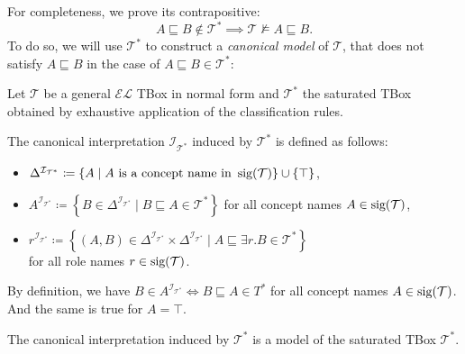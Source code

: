 For completeness, we prove its contrapositive:
\[
	A \sqsubseteq B \notin \mathcal{T}^* \implies \mathcal{T} \not\vDash A \sqsubseteq B
.\]
To do so, we will use $\mathcal{T}^*$ to construct a \textit{canonical model} of $\mathcal{T}$,
that does not satisfy $A \sqsubseteq B$ in the case of $A \sqsubseteq B \in \mathcal{T}^*$:
\begin{definition}
	Let $\mathcal{T}$ be a general $\mathcal{EL}$ TBox in normal form and $\mathcal{T}^*$ the saturated TBox
	obtained by exhaustive application of the classification rules.
	
	The canonical interpretation $\mathcal{I}_{\mathcal{T}^*}$ induced by $\mathcal{T}^*$ is defined as follows:
	\begin{itemize}
		\item $\Delta^{\mathcal{I}_{\mathcal{T}^*}} \coloneqq \left\{ A \mid A \text{ is a concept name in } \operatorname{\text{sig}}(\mathcal{T}) \right\} \cup \left\{ \top \right\}$,
		\item $A^{\mathcal{I}_{\mathcal{T}^*}} \coloneqq \left\{ B \in \Delta^{\mathcal{I}_{\mathcal{T}^*}} \mid B \sqsubseteq A \in \mathcal{T}^* \right\}$ for all concept names $A \in \operatorname{\text{sig}}(\mathcal{T})$,
		\item $r^{\mathcal{I}_{\mathcal{T}^*}} \coloneqq \left\{ (A,B) \in \Delta^{\mathcal{I}_{\mathcal{T}^*}} \times \Delta^{\mathcal{I}_{\mathcal{T}^*}} \mid A \sqsubseteq \exists r.B \in \mathcal{T}^* \right\}$ \\
			for all role names $r \in \operatorname{\text{sig}}(\mathcal{T})$.
	\end{itemize}
\end{definition}
\begin{note}
	By definition, we have $B \in A^{\mathcal{I}_{\mathcal{T}^*}} \iff B \sqsubseteq A \in T^*$ for all concept names $A \in \operatorname{\text{sig}}(\mathcal{T})$.
	And the same is true for $A = \top$.
\end{note}
\begin{lemma}
	The canonical interpretation induced by $\mathcal{T}^*$ is a model of the saturated TBox $\mathcal{T}^*$.
\end{lemma}
